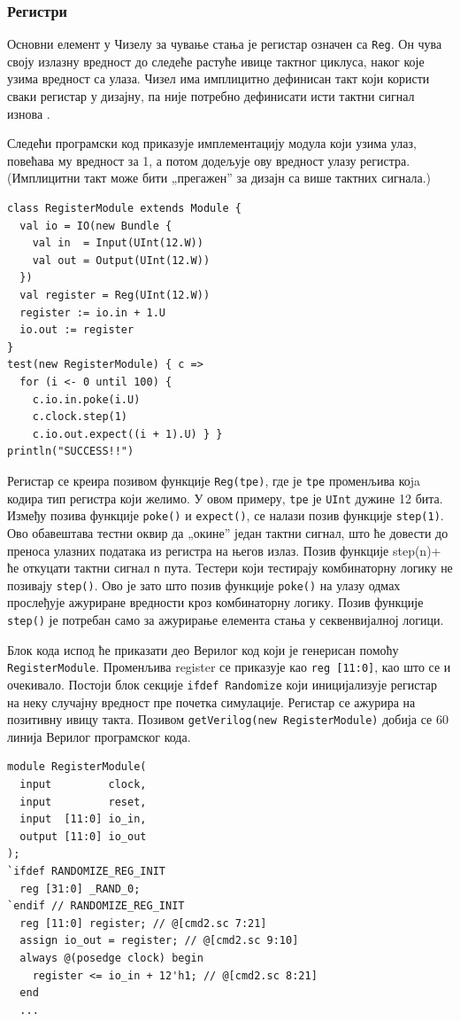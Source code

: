 \documentclass[12pt, a4paper]{article}
\theoremstyle{definition}
\begin{document}
\subsubsection{Регистри}
Основни елемент у Чизелу за чување стања је регистар означен са \verb+Reg+. Он чува своју излазну вредност до следеће растуће ивице тактног циклуса, наког које узима вредност са улаза. Чизел има имплицитно дефинисан такт који користи сваки регистар у дизајну, па није потребно дефинисати исти тактни сигнал изнова \cite{git_chisel}.

Следећи програмски код приказује имплементацију модула који узима улаз, повећава му вредност за 1, а потом додељује ову вредност улазу регистра. (Имплицитни такт може бити „прегажен” за дизајн са више тактних сигнала.)
\begin{verbatim}
class RegisterModule extends Module {
  val io = IO(new Bundle {
    val in  = Input(UInt(12.W))
    val out = Output(UInt(12.W))
  })
  val register = Reg(UInt(12.W))
  register := io.in + 1.U
  io.out := register
}
test(new RegisterModule) { c =>
  for (i <- 0 until 100) {
    c.io.in.poke(i.U)
    c.clock.step(1)
    c.io.out.expect((i + 1).U) } }
println("SUCCESS!!")
\end{verbatim}

Регистар се креира позивом функције \verb+Reg(tpe)+, где је \verb+tpe+ променљива коja кодира тип регистра који желимо. У овом примеру, \verb+tpe+ је \verb+UInt+ дужине 12 бита. Између позива функције \verb+poke()+ и \verb+expect()+, се налази позив функције \verb+step(1)+. Ово обавештава тестни оквир да „окине” један тактни сигнал, што ће довести до преноса улазних података из регистра на његов излаз. Позив функције step(n)+ ће откуцати тактни сигнал \verb+n+ пута.
Тестери који тестирају комбинаторну логику не позивају \verb+step()+. Ово је зато што позив функције \verb+poke()+ на улазу одмах прослеђује ажуриране вредности кроз комбинаторну логику. Позив функције \verb+step()+ је потребан само за ажурирање елемента стања у секвенвијалној логици.

Блок кода испод ће приказати део Верилог код који је генерисан помоћу \verb+RegisterModule+.
Променљива register се приказује као \verb+reg [11:0]+, као што се и очекивало.
Постоји блок секције \verb+ifdef Randomize+ који иницијализује регистар на неку случајну вредност пре почетка симулације.
Регистар се ажурира на позитивну ивицу такта. Позивом \verb+getVerilog(new RegisterModule)+ добија се 60 линија Верилог програмског кода.
\begin{verbatim}
module RegisterModule(
  input         clock,
  input         reset,
  input  [11:0] io_in,
  output [11:0] io_out
);
`ifdef RANDOMIZE_REG_INIT
  reg [31:0] _RAND_0;
`endif // RANDOMIZE_REG_INIT
  reg [11:0] register; // @[cmd2.sc 7:21]
  assign io_out = register; // @[cmd2.sc 9:10]
  always @(posedge clock) begin
    register <= io_in + 12'h1; // @[cmd2.sc 8:21]
  end
  ...
\end{verbatim}
\end{document}
